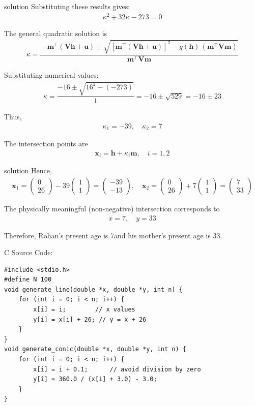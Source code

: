 \documentclass{beamer}
\numberwithin{equation}{section}
\theoremstyle{remark}
\newcommand{\myvec}[1]{\ensuremath{\begin{pmatrix}#1\end{pmatrix}}}
\let\vec\mathbf
\begin{document}
\begin{frame}{solution}
Substituting these results gives:
\begin{align}
\kappa^2 + 32\kappa - 273 = 0
\end{align}

The general quadratic solution is
\begin{align}
\kappa =
\dfrac{
-\,\vec{m}^\top (\vec{V}\vec{h} + \vec{u})
\pm
\sqrt{
\left[\vec{m}^\top (\vec{V}\vec{h} + \vec{u})\right]^2
- g(\vec{h})\,(\vec{m}^\top \vec{V}\vec{m})
}
}{
\vec{m}^\top \vec{V}\vec{m}
}
\end{align}

Substituting numerical values:
\begin{align}
\kappa =
\dfrac{-16 \pm \sqrt{16^2 - (-273)}}{1}
= -16 \pm \sqrt{529}
= -16 \pm 23
\end{align}

Thus,
\begin{align}
\kappa_1 = -39, \quad \kappa_2 = 7
\end{align}

The intersection points are
\begin{align}
\vec{x}_i = \vec{h} + \kappa_i \vec{m}, \quad i = 1,2
\end{align}
\end{frame}
\begin{frame}{solution}
Hence,
\begin{align}
\vec{x}_1 = \myvec{0 \\ 26} - 39\myvec{1 \\ 1} = \myvec{-39 \\ -13}, \quad
\vec{x}_2 = \myvec{0 \\ 26} + 7\myvec{1 \\ 1} = \myvec{7 \\ 33}
\end{align}

The physically meaningful (non-negative) intersection corresponds to
\begin{align}
\boxed{x = 7, \quad y = 33}
\end{align}

Therefore, Rohan's present age is {7}and his mother's present age is{ 33}.

\end{frame}
\begin{frame}[fragile]{C Source Code:}
\begin{verbatim}
#include <stdio.h>
#define N 100
void generate_line(double *x, double *y, int n) {
    for (int i = 0; i < n; i++) {
        x[i] = i;        // x values
        y[i] = x[i] + 26; // y = x + 26
    }
}
void generate_conic(double *x, double *y, int n) {
    for (int i = 0; i < n; i++) {
        x[i] = i + 0.1;      // avoid division by zero
        y[i] = 360.0 / (x[i] + 3.0) - 3.0;
    }
}


\end{verbatim}
\end{frame}
\end{document}
